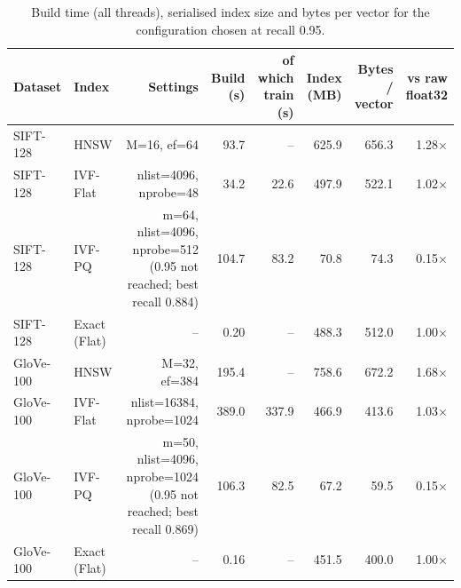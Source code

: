 \begin{table}[t]
\centering
\small
\caption{Build time (all threads), serialised index size and bytes per vector for the configuration chosen at recall 0.95.}
\label{tab:t2b_cost_at_095}
\begin{tabular}{llrrrrrr}
\toprule
Dataset & Index & Settings & Build (s) & of which train (s) & Index (MB) & Bytes / vector & vs raw float32 \\
\midrule
SIFT-128 & HNSW & M=16, ef=64 & 93.7 & -- & 625.9 & 656.3 & 1.28$\times$ \\
SIFT-128 & IVF-Flat & nlist=4096, nprobe=48 & 34.2 & 22.6 & 497.9 & 522.1 & 1.02$\times$ \\
SIFT-128 & IVF-PQ & m=64, nlist=4096, nprobe=512 (0.95 not reached; best recall 0.884) & 104.7 & 83.2 & 70.8 & 74.3 & 0.15$\times$ \\
SIFT-128 & Exact (Flat) & -- & 0.20 & -- & 488.3 & 512.0 & 1.00$\times$ \\
GloVe-100 & HNSW & M=32, ef=384 & 195.4 & -- & 758.6 & 672.2 & 1.68$\times$ \\
GloVe-100 & IVF-Flat & nlist=16384, nprobe=1024 & 389.0 & 337.9 & 466.9 & 413.6 & 1.03$\times$ \\
GloVe-100 & IVF-PQ & m=50, nlist=4096, nprobe=1024 (0.95 not reached; best recall 0.869) & 106.3 & 82.5 & 67.2 & 59.5 & 0.15$\times$ \\
GloVe-100 & Exact (Flat) & -- & 0.16 & -- & 451.5 & 400.0 & 1.00$\times$ \\
\bottomrule
\end{tabular}
\end{table}

